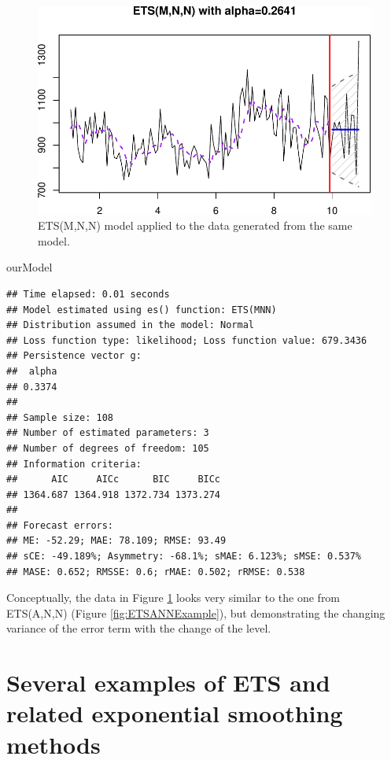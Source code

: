 \documentclass[
]{book}
\newenvironment{Shaded}{\begin{snugshade}}{\end{snugshade}}
\newcommand{\NormalTok}[1]{#1}
\theoremstyle{definition}
\theoremstyle{definition}
\theoremstyle{definition}
\theoremstyle{definition}
\theoremstyle{remark}
\begin{document}
\begin{figure}
\centering
\includegraphics{Svetunkov--2022----ADAM_files/figure-latex/ETSMNNExample-1.pdf}
\caption{\label{fig:ETSMNNExample}ETS(M,N,N) model applied to the data generated from the same model.}
\end{figure}

\begin{Shaded}
\begin{Highlighting}[]
\NormalTok{ourModel}
\end{Highlighting}
\end{Shaded}

\begin{verbatim}
## Time elapsed: 0.01 seconds
## Model estimated using es() function: ETS(MNN)
## Distribution assumed in the model: Normal
## Loss function type: likelihood; Loss function value: 679.3436
## Persistence vector g:
##  alpha 
## 0.3374 
## 
## Sample size: 108
## Number of estimated parameters: 3
## Number of degrees of freedom: 105
## Information criteria:
##      AIC     AICc      BIC     BICc 
## 1364.687 1364.918 1372.734 1373.274 
## 
## Forecast errors:
## ME: -52.29; MAE: 78.109; RMSE: 93.49
## sCE: -49.189%; Asymmetry: -68.1%; sMAE: 6.123%; sMSE: 0.537%
## MASE: 0.652; RMSSE: 0.6; rMAE: 0.502; rRMSE: 0.538
\end{verbatim}

Conceptually, the data in Figure \ref{fig:ETSMNNExample} looks very similar to the one from ETS(A,N,N) (Figure \ref{fig:ETSANNExample}), but demonstrating the changing variance of the error term with the change of the level.

\hypertarget{ETSExamples}{%
\section{Several examples of ETS and related exponential smoothing methods}\label{ETSExamples}}
\end{document}
